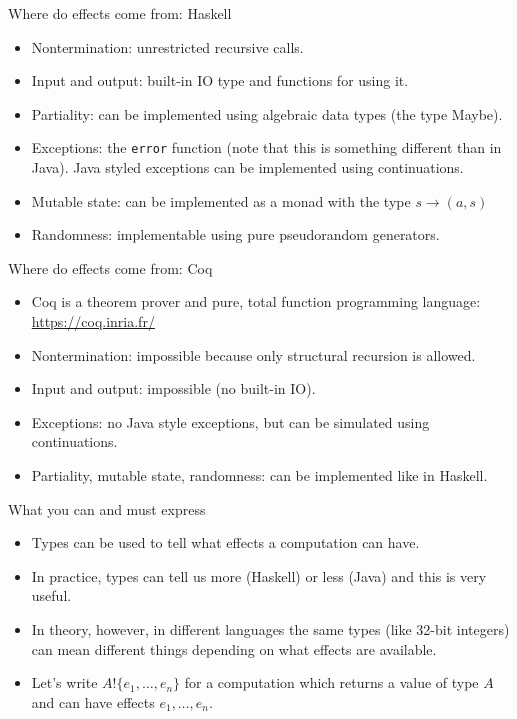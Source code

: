 \documentclass{beamer}
\newcommand{\eff}[2]{#1 ! \{ #2 \}}
\begin{document}
\begin{frame}{Where do effects come from: Haskell}
\begin{itemize}
	\item Nontermination: unrestricted recursive calls.
	\item Input and output: built-in IO type and functions for using it.
	\item Partiality: can be implemented using algebraic data types (the type Maybe).
	\item Exceptions: the \texttt{error} function (note that this is something different than in Java). Java styled exceptions can be implemented using continuations.
	\item Mutable state: can be implemented as a monad with the type $s \to (a, s)$
	\item Randomness: implementable using pure pseudorandom generators.
\end{itemize}
\end{frame}

\begin{frame}{Where do effects come from: Coq}
\begin{itemize}
	\item Coq is a theorem prover and pure, total function programming language: \href{https://coq.inria.fr/}{https://coq.inria.fr/}
	\item Nontermination: impossible because only structural recursion is allowed.
	\item Input and output: impossible (no built-in IO).
	\item Exceptions: no Java style exceptions, but can be simulated using continuations.
	\item Partiality, mutable state, randomness: can be implemented like in Haskell.
\end{itemize}
\end{frame}

\begin{frame}{What you can and must express}
\begin{itemize}
	\item Types can be used to tell what effects a computation can have.
	\item In practice, types can tell us more (Haskell) or less (Java) and this is very useful.
	\item In theory, however, in different languages the same types (like 32-bit integers) can mean different things depending on what effects are available.
	\item Let's write $\eff{A}{e_1, \dots, e_n}$ for a computation which returns a value of type $A$ and can have effects $e_1, \dots, e_n$.
\end{itemize}
\end{frame}
\end{document}

